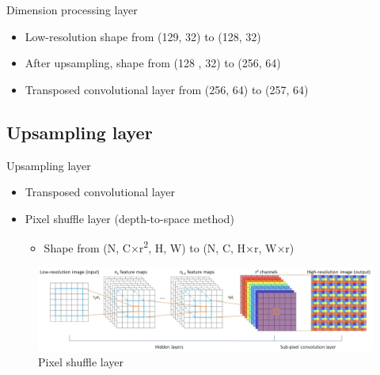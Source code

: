 \documentclass{beamer}
\newcounter{section}
\begin{document}
\begin{frame}[t]{Dimension processing layer}
\begin{itemize}
            \begin{itemize}
                \vspace{0.2\baselineskip}
                \item Low-resolution shape from (129, 32) to (128, 32)
                \vspace{0.2\baselineskip}
                \item After upsampling, shape from (128 , 32) to (256, 64)
                \vspace{0.2\baselineskip}
                \item Transposed convolutional layer from (256, 64) to (257, 64)
            \end{itemize}
    \end{itemize}

\end{frame}



\subsection{Upsampling layer}

\begin{frame}[t]{Upsampling layer}
    \begin{itemize}
    	\item Transposed convolutional layer
        \vspace{0.5\baselineskip}
        \item Pixel shuffle layer (depth-to-space method)
        \begin{itemize}
            \vspace{0.3\baselineskip}
            \item Shape from (N, C$\times$r\textsuperscript{2}, H, W) to (N, C, H$\times$r, W$\times$r)
        \end{itemize}
    \end{itemize}

    \vspace{0.5\baselineskip}

    \begin{figure}
        \centering
        \includegraphics[scale=.27]{MA_presentation/figures/pixelShuffle.png}
        \caption{Pixel shuffle layer \cite{shi_real-time_2016}}
    \end{figure}

\end{frame}
\end{document}
